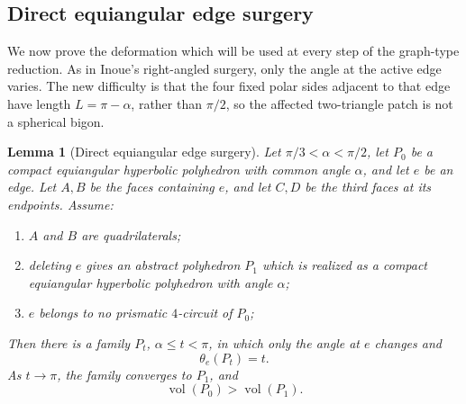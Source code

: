 \documentclass[12pt,a4paper]{article}
\newtheorem{lemma}[theorem]{Lemma}
\theoremstyle{definition}
\DeclareMathOperator{\Vol}{vol}
\begin{document}
\subsection{Direct equiangular edge surgery}\label{subsec:direct-edge-surgery}

We now prove the deformation which will be used at every step of the
graph-type reduction.  As in Inoue's right-angled surgery, only the angle at
the active edge varies.  The new difficulty is that the four fixed polar
sides adjacent to that edge have length \(L=\pi-\alpha\), rather than
\(\pi/2\), so the affected two-triangle patch is not a spherical bigon.

\begin{lemma}[Direct equiangular edge surgery]\label{lem:direct-equiangular-edge-surgery}
Let \(\pi/3<\alpha<\pi/2\), let \(P_0\) be a compact equiangular hyperbolic
polyhedron with common angle \(\alpha\), and let \(e\) be an edge.  Let
\(A,B\) be the faces containing
\(e\), and let \(C,D\) be the third faces at its endpoints.  Assume:
\begin{enumerate}[label=\textup{(S\arabic*)},itemsep=0.15em,topsep=0.3em]
\item \(A\) and \(B\) are quadrilaterals;
\item deleting \(e\) gives an abstract polyhedron \(P_1\) which is realized as
a compact equiangular hyperbolic polyhedron with angle \(\alpha\);
\item \(e\) belongs to no prismatic \(4\)-circuit of \(P_0\);
\end{enumerate}
Then there is a family \(P_t\), \(\alpha\le t<\pi\), in which only the angle at
\(e\) changes and
\[
        \theta_e(P_t)=t.
\]
As \(t\to\pi\), the family converges to \(P_1\), and
\[
        \Vol(P_0)>\Vol(P_1).
\]
\end{lemma}
\end{document}
